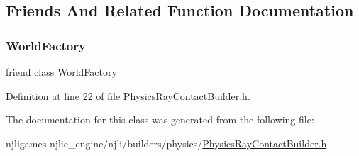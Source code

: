 \subsection{Friends And Related Function Documentation}
\mbox{\label{classnjli_1_1_physics_ray_contact_builder_acb96ebb09abe8f2a37a915a842babfac}} 
\subsubsection{\texorpdfstring{World\+Factory}{WorldFactory}}
{\footnotesize\ttfamily friend class \mbox{\hyperlink{classnjli_1_1_world_factory}{World\+Factory}}\hspace{0.3cm}{\ttfamily [friend]}}



Definition at line 22 of file Physics\+Ray\+Contact\+Builder.\+h.



The documentation for this class was generated from the following file\+:\begin{DoxyCompactItemize}
\item 
njligames-\/njlic\+\_\+engine/njli/builders/physics/\mbox{\hyperlink{_physics_ray_contact_builder_8h}{Physics\+Ray\+Contact\+Builder.\+h}}\end{DoxyCompactItemize}
